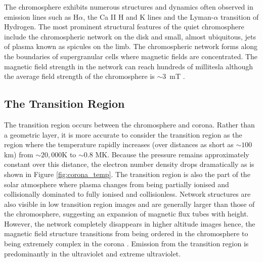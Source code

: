 The chromosphere exhibits numerous structures and dynamics often observed in emission lines such as H$\alpha$, the Ca II H and K lines and the Lyman-$\alpha$ transition of Hydrogen. The most prominent structural features of the quiet chromosphere include the chromospheric network on the disk and small, almost ubiquitous, jets of plasma known as spicules on the limb. The chromospheric network forms along the boundaries of supergranular cells where magnetic fields are concentrated. The magnetic field strength in the network can reach hundreds of millitesla although the average field strength of the chromosphere is $\sim 3$~mT \citep{McLean1985}.


\subsection{The Transition Region}
The transition region occurs between the chromosphere and corona. Rather than a geometric layer, it is more accurate to consider the transition region as the region where the temperature rapidly increases (over distances as short as $\sim 100$ km) from $\sim 20,000$K to $\sim 0.8$ MK. Because the pressure remains approximately constant over this distance, the electron number density drops dramatically as is shown in Figure \ref{fig:corona_temp}. The transition region is also the part of the solar atmosphere where plasma changes from being partially ionised and collisionally dominated to fully ionised and collisionless. Network structures are also visible in low transition region images and are generally larger than those of the chromosphere, suggesting an expansion of magnetic flux tubes with height. However, the network completely disappears in higher altitude images hence, the magnetic field structure transitions from being ordered in the chromosphere to being extremely complex in the corona \citep{Tian2017}. Emission from the transition region is predominantly in the ultraviolet and extreme ultraviolet.

